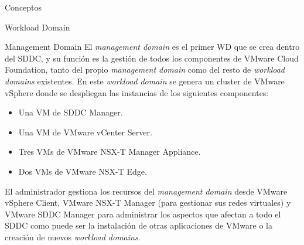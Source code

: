 \begin{section}{Conceptos}
\begin{subsection}{Workload Domain}
\begin{subsubsection}{Management Domain}
\label{subsubsec:domainManagement}
El \textit{management domain} es el primer WD que se crea dentro del SDDC, y su función es la gestión de todos los componentes de VMware Cloud Foundation, tanto del propio \textit{management domain} como del resto de \textit{workload domains} existentes.
En este \textit{workload domain} se genera un cluster de VMware vSphere donde se despliegan las instancias de los siguientes componentes:
\begin{itemize}
  \item Una VM de SDDC Manager.
  \item Una VM de VMware vCenter Server.
  \item Tres VMs de VMware NSX-T Manager Appliance.
  \item Dos VMs de VMware NSX-T Edge.
\end{itemize}
El administrador gestiona los recursos del \textit{management domain} desde VMware vSphere Client, VMware NSX-T Manager (para gestionar sus redes virtuales) y VMware SDDC Manager para administrar los aspectos que afectan a todo el SDDC como puede ser la instalación de otras aplicaciones de VMware o la creación de nuevos \textit{workload domains}. 


\end{subsubsection}
\end{subsection}
\end{section}
